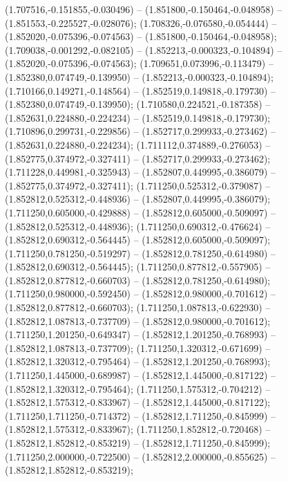  (1.707516,-0.151855,-0.030496) -- (1.851800,-0.150464,-0.048958) -- (1.851553,-0.225527,-0.028076);
 (1.708326,-0.076580,-0.054444) -- (1.852020,-0.075396,-0.074563) -- (1.851800,-0.150464,-0.048958);
 (1.709038,-0.001292,-0.082105) -- (1.852213,-0.000323,-0.104894) -- (1.852020,-0.075396,-0.074563);
 (1.709651,0.073996,-0.113479) -- (1.852380,0.074749,-0.139950) -- (1.852213,-0.000323,-0.104894);
 (1.710166,0.149271,-0.148564) -- (1.852519,0.149818,-0.179730) -- (1.852380,0.074749,-0.139950);
 (1.710580,0.224521,-0.187358) -- (1.852631,0.224880,-0.224234) -- (1.852519,0.149818,-0.179730);
 (1.710896,0.299731,-0.229856) -- (1.852717,0.299933,-0.273462) -- (1.852631,0.224880,-0.224234);
 (1.711112,0.374889,-0.276053) -- (1.852775,0.374972,-0.327411) -- (1.852717,0.299933,-0.273462);
 (1.711228,0.449981,-0.325943) -- (1.852807,0.449995,-0.386079) -- (1.852775,0.374972,-0.327411);
 (1.711250,0.525312,-0.379087) -- (1.852812,0.525312,-0.448936) -- (1.852807,0.449995,-0.386079);
 (1.711250,0.605000,-0.429888) -- (1.852812,0.605000,-0.509097) -- (1.852812,0.525312,-0.448936);
 (1.711250,0.690312,-0.476624) -- (1.852812,0.690312,-0.564445) -- (1.852812,0.605000,-0.509097);
 (1.711250,0.781250,-0.519297) -- (1.852812,0.781250,-0.614980) -- (1.852812,0.690312,-0.564445);
 (1.711250,0.877812,-0.557905) -- (1.852812,0.877812,-0.660703) -- (1.852812,0.781250,-0.614980);
 (1.711250,0.980000,-0.592450) -- (1.852812,0.980000,-0.701612) -- (1.852812,0.877812,-0.660703);
 (1.711250,1.087813,-0.622930) -- (1.852812,1.087813,-0.737709) -- (1.852812,0.980000,-0.701612);
 (1.711250,1.201250,-0.649347) -- (1.852812,1.201250,-0.768993) -- (1.852812,1.087813,-0.737709);
 (1.711250,1.320312,-0.671699) -- (1.852812,1.320312,-0.795464) -- (1.852812,1.201250,-0.768993);
 (1.711250,1.445000,-0.689987) -- (1.852812,1.445000,-0.817122) -- (1.852812,1.320312,-0.795464);
 (1.711250,1.575312,-0.704212) -- (1.852812,1.575312,-0.833967) -- (1.852812,1.445000,-0.817122);
 (1.711250,1.711250,-0.714372) -- (1.852812,1.711250,-0.845999) -- (1.852812,1.575312,-0.833967);
 (1.711250,1.852812,-0.720468) -- (1.852812,1.852812,-0.853219) -- (1.852812,1.711250,-0.845999);
 (1.711250,2.000000,-0.722500) -- (1.852812,2.000000,-0.855625) -- (1.852812,1.852812,-0.853219);

